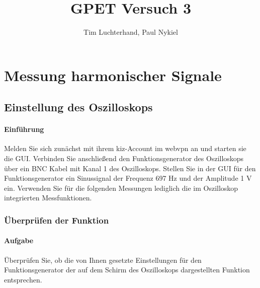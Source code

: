 \documentclass[10pt]{report}
\author{Tim Luchterhand, Paul Nykiel}
\title{GPET Versuch 3}
\begin{document}
        \maketitle

        \section{Messung harmonischer Signale}
        \subsection{Einstellung des Oszilloskops}
        \paragraph{Einführung}
        Melden Sie sich zunächst mit ihrem kiz-Account im webvpn an und starten sie die GUI.\@
        Verbinden Sie anschließend den Funktionsgenerator des Oszilloskops über ein BNC Kabel
        mit Kanal 1 des Oszilloskops. Stellen Sie in der GUI für den Funktionsgenerator ein Sinussignal der Frequenz 697 Hz und der Amplitude 1 V ein. Verwenden Sie für die folgenden
        Messungen lediglich die im Oszilloskop integrierten Messfunktionen.

        \subsubsection{Überprüfen der Funktion}
        \paragraph{Aufgabe}
        Überprüfen Sie, ob die von Ihnen gesetzte Einstellungen für den Funktionsgenerator
        der auf dem Schirm des Oszilloskops dargestellten Funktion entsprechen.
\end{document}
